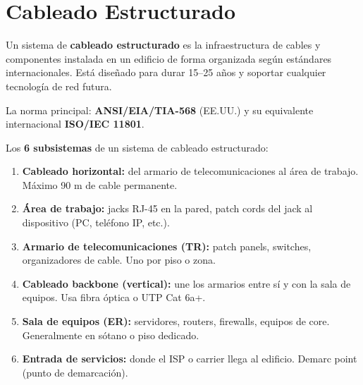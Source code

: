 \section{ Cableado Estructurado}

\begin{concepto}
Un sistema de \textbf{cableado estructurado} es la infraestructura de cables
y componentes instalada en un edificio de forma organizada según estándares
internacionales. Está diseñado para durar 15--25 años y soportar cualquier
tecnología de red futura.

La norma principal: \textbf{ANSI/EIA/TIA-568} (EE.UU.) y su equivalente
internacional \textbf{ISO/IEC 11801}.
\end{concepto}

Los \textbf{6 subsistemas} de un sistema de cableado estructurado:

\begin{enumerate}
    \item \textbf{Cableado horizontal:} del armario de telecomunicaciones
          al área de trabajo. Máximo 90 m de cable permanente.
    \item \textbf{Área de trabajo:} jacks RJ-45 en la pared, patch cords
          del jack al dispositivo (PC, teléfono IP, etc.).
    \item \textbf{Armario de telecomunicaciones (TR):} patch panels, switches,
          organizadores de cable. Uno por piso o zona.
    \item \textbf{Cableado backbone (vertical):} une los armarios entre sí
          y con la sala de equipos. Usa fibra óptica o UTP Cat 6a+.
    \item \textbf{Sala de equipos (ER):} servidores, routers, firewalls,
          equipos de core. Generalmente en sótano o piso dedicado.
    \item \textbf{Entrada de servicios:} donde el ISP o carrier llega
          al edificio. Demarc point (punto de demarcación).
\end{enumerate}

